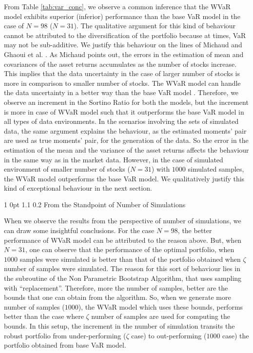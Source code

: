 \documentclass[12pt]{article}
\makeatletter
\numberwithin{equation}{section}
\renewcommand{\subsubsection}{
  \@startsection
  {subsubsection}%
  {1}%
  {0pt}%
  {1.1\baselineskip}%
  {0.2\baselineskip}%
  {\sc \centering}%
}
\makeatother
\begin{document}
From Table \ref{tab:var_conc}, we observe a common inference that the WVaR model exhibits superior (inferior) performance than the base VaR model in the case of $N=98$ ($N=31$). The qualitative argument for this kind of behaviour cannot be attributed to the diversification of the portfolio because at times, VaR may not be sub-additive. We justify this behaviour on the lines of Michaud \cite{Michaud} and Ghaoui et al. \cite{Ghaoui03}. As Michaud points out, the errors in the estimation of mean and covariances of the asset returns accumulates as the number of stocks increase. This implies that the data uncertainty in the case of larger number of stocks is more in comparison to smaller number of stocks. The WVaR model can handle the data uncertainty in a better way than the base VaR model \cite{Ghaoui03}. Therefore, we observe an increment in the Sortino Ratio for both the models, but the increment is more in case of WVaR model such that it outperforms the base VaR model in all types of data environments. In the scenarios involving the sets of simulated data, the same argument explains the behaviour, as the estimated moments' pair are used as true moments' pair, for the generation of the data. So the error in the estimation of the mean and the variance of the asset returns affects the behaviour in the same way as in the market data. However, in the case of simulated environment of smaller number of stocks ($N=31$) with $1000$ simulated samples, the WVaR model outperforms the base VaR model. We qualitatively justify this kind of exceptional behaviour in the next section.

\subsubsection{From the Standpoint of Number of Simulations}

When we observe the results from the perspective of number of simulations, we can draw some insightful conclusions. For the case $N=98$, the better performance of WVaR model can be attributed to the reason above. But, when $N=31$, one can observe that the performance of the optimal portfolio, when $1000$ samples were simulated is better than that of the portfolio obtained when $\zeta$ number of samples were simulated. The reason for this sort of behaviour lies in the subroutine of the Non Parametric Bootstrap Algorithm, that uses sampling with ``replacement''. Therefore, more the number of samples, better are the bounds that one can obtain from the algorithm. So, when we generate more number of samples ($1000$), the WVaR model which uses these bounds, performs better than the case where $\zeta$ number of samples are used for computing the bounds. In this setup, the increment in the number of simulation transits the robust portfolio from under-performing ($\zeta$ case) to out-performing ($1000$ case) the portfolio obtained from base VaR model.
\end{document}
